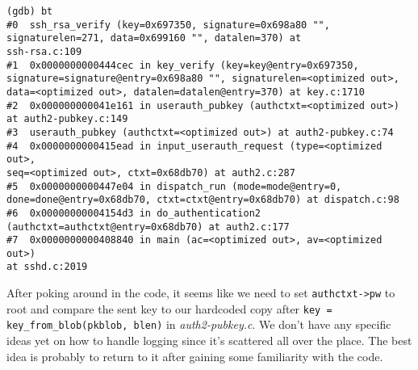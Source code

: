 \documentclass[a4paper,10pt]{article}
\begin{document}
\begin{verbatim}
(gdb) bt
#0  ssh_rsa_verify (key=0x697350, signature=0x698a80 "", 
signaturelen=271, data=0x699160 "", datalen=370) at 
ssh-rsa.c:109
#1  0x0000000000444cec in key_verify (key=key@entry=0x697350, 
signature=signature@entry=0x698a80 "", signaturelen=<optimized out>, 
data=<optimized out>, datalen=datalen@entry=370) at key.c:1710
#2  0x000000000041e161 in userauth_pubkey (authctxt=<optimized out>) 
at auth2-pubkey.c:149
#3  userauth_pubkey (authctxt=<optimized out>) at auth2-pubkey.c:74
#4  0x0000000000415ead in input_userauth_request (type=<optimized out>, 
seq=<optimized out>, ctxt=0x68db70) at auth2.c:287
#5  0x0000000000447e04 in dispatch_run (mode=mode@entry=0, 
done=done@entry=0x68db70, ctxt=ctxt@entry=0x68db70) at dispatch.c:98
#6  0x00000000004154d3 in do_authentication2 
(authctxt=authctxt@entry=0x68db70) at auth2.c:177
#7  0x0000000000408840 in main (ac=<optimized out>, av=<optimized out>) 
at sshd.c:2019
\end{verbatim}

After poking around in the code, it seems like we need to set 
\lstinline|authctxt->pw| to root and compare the sent key to our
hardcoded copy after \lstinline|key = key_from_blob(pkblob, blen)|
in \emph{auth2-pubkey.c}. We don't have any specific ideas yet on how to handle
logging since it's scattered all over the place. The best idea is probably
to return to it after gaining some familiarity with the code.
\end{document}
